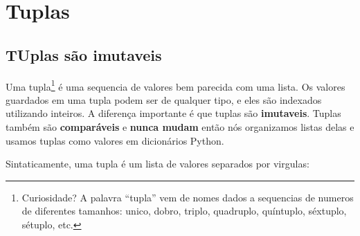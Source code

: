 
\chapter{Tuplas}
\label{tuplechap}

\section{TUplas são imutaveis}


Uma tupla\footnote{Curiosidade? A palavra ``tupla'' vem de nomes 
dados a sequencias de numeros de diferentes tamanhos: unico, dobro,
triplo, quadruplo, quíntuplo, séxtuplo, sétuplo, etc.} é uma sequencia
de valores bem parecida com uma lista.
Os valores guardados em uma tupla podem ser de qualquer tipo, e
eles são indexados utilizando inteiros.
A diferença importante é que tuplas são {\bf imutaveis}.
Tuplas também são {\bf comparáveis} e {\bf nunca mudam} então nós
organizamos listas delas e usamos tuplas como valores em dicionários Python.


Sintaticamente, uma tupla é um lista de valores separados por virgulas:

